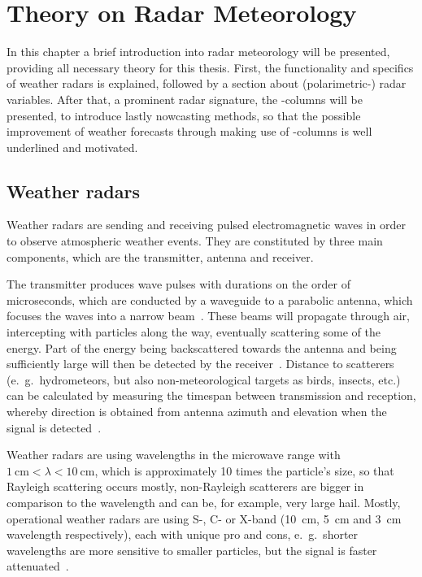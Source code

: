 
\chapter{Theory on Radar Meteorology}
\label{sec:theory}
In this chapter a brief introduction into radar meteorology will be presented, providing all necessary theory for this thesis. First, the functionality and specifics of weather radars is explained, followed by a section about (polarimetric-) radar variables. After that, a prominent radar signature, the \zdr-columns will be presented, to introduce lastly nowcasting methods, so that the possible improvement of weather forecasts through making use of \zdr-columns is well underlined and motivated.

\section{Weather radars}
\label{sec:radars}
Weather radars are sending and receiving pulsed electromagnetic waves in order to observe atmospheric weather events. They are constituted by three main components, which are the transmitter, antenna and receiver.

The transmitter produces wave pulses with durations on the order of microseconds, which are conducted by a waveguide to a parabolic antenna, which focuses the waves into a narrow beam~\cite{yau1996short}. These beams will propagate through air, intercepting with particles along the way, eventually scattering some of the energy. 
Part of the energy being backscattered towards the antenna and being sufficiently large will then be detected by the receiver~\cite{yau1996short}.
Distance to scatterers (e.\ g.\ hydrometeors, but also non-meteorological targets as birds, insects, etc.) can be calculated by measuring the timespan between transmission and reception, whereby direction is obtained from antenna azimuth and elevation when the signal is detected~\cite{yau1996short, fukao2014radar}.

Weather radars are using wavelengths in the microwave range with $\SI{1}{\centi\meter} < \lambda < \SI{10}{\centi\meter}$, which is approximately 10 times the particle's size, so that Rayleigh scattering occurs mostly, non-Rayleigh scatterers are bigger in comparison to the wavelength and can be, for example, very large hail.
Mostly, operational weather radars are using S-, C- or X-band (\SI{10}{\centi\metre}, \SI{5}{\centi\metre} and \SI{3}{\centi\metre} wavelength respectively), each with unique pro and cons, e.\ g.\ shorter wavelengths are more sensitive to smaller particles, but the signal is faster attenuated~\cite{doviak_doppler_1993}.

